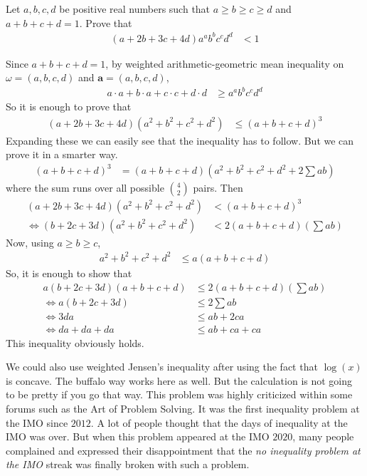 \documentclass{subfile}
\begin{document}
		\begin{problem}
			Let $a,b,c,d$ be positive real numbers such that $a\geq b\geq c\geq d$ and $a+b+c+d=1$. Prove that
				\begin{align*}
					(a+2b+3c+4d)a^{a}b^{b}c^{c}d^{d}
						& < 1
				\end{align*}
			
				\begin{solution}
					Since $a+b+c+d=1$, by weighted arithmetic-geometric mean inequality on $\omega=(a,b,c,d)$ and $\mathbf{a}=(a,b,c,d)$,
						\begin{align*}
							a\cdot a+b\cdot a+c\cdot c+d\cdot d
								& \geq a^{a}b^{b}c^{c}d^{d}
						\end{align*}
					So it is enough to prove that
						\begin{align*}
							(a+2b+3c+4d)(a^{2}+b^{2}+c^{2}+d^{2})
								& \leq (a+b+c+d)^{3}
						\end{align*}
					Expanding these we can easily see that the inequality has to follow. But we can prove it in a smarter way.
						\begin{align*}
							(a+b+c+d)^{3}
								& = (a+b+c+d)\left(a^{2}+b^{2}+c^{2}+d^{2}+2\sum ab\right)
						\end{align*}
					where the sum runs over all possible $\binom{4}{2}$ pairs. Then
						\begin{align*}
							(a+2b+3c+4d)(a^{2}+b^{2}+c^{2}+d^{2})
							& < (a+b+c+d)^{3}\\
							\iff (b+2c+3d)(a^{2}+b^{2}+c^{2}+d^{2})
								& < 2(a+b+c+d)\left(\sum ab\right)
						\end{align*}
					Now, using $a\geq b\geq c$,
						\begin{align*}
							a^{2}+b^{2}+c^{2}+d^{2}
								& \leq a(a+b+c+d)
						\end{align*}
					So, it is enough to show that
						\begin{align*}
							a(b+2c+3d)(a+b+c+d)
								& \leq  2(a+b+c+d)\left(\sum ab\right)\\
							\iff a(b+2c+3d)
								& \leq 2\sum ab\\
							\iff 3da
								& \leq ab+2ca\\
							\iff da+da+da
								& \leq ab+ca+ca
						\end{align*}
					This inequality obviously holds.
				\end{solution}
			
				\begin{remark}
					We could also use weighted Jensen's inequality after using the fact that $\log(x)$ is concave. The buffalo way works here as well. But the calculation is not going to be pretty if you go that way. This problem was highly criticized within some forums such as the Art of Problem Solving. It was the first inequality problem at the IMO since $2012$. A lot of people thought that the days of inequality at the IMO was over. But when this problem appeared at the IMO $2020$, many people complained and expressed their disappointment that the \textit{no inequality problem at the IMO} streak was finally broken with such a problem.
				\end{remark}
		\end{problem}
	
\end{document}
